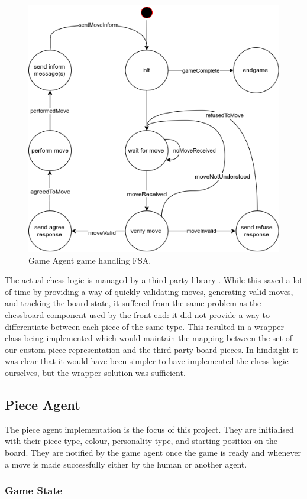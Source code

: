 \documentclass{article}
\begin{document}
\begin{figure}[!ht]
	\centering
	\includegraphics[width=0.8\linewidth]{images/gameagentfsa}
	\caption{Game Agent game handling FSA.}
	\label{fig:gameagentfsa}
\end{figure}

The actual chess logic is managed by a third party library \cite{chesslib}. While this saved a lot of time by providing a way of quickly validating moves, generating valid moves, and tracking the board state, it suffered from the same problem as the chessboard component used by the front-end: it did not provide a way to differentiate between each piece of the same type. This resulted in a wrapper class being implemented which would maintain the mapping between the set of our custom piece representation and the third party board pieces. In hindsight it was clear that it would have been simpler to have implemented the chess logic ourselves, but the wrapper solution was sufficient.

\subsection{Piece Agent}

The piece agent implementation is the focus of this project. They are initialised with their piece type, colour, personality type, and starting position on the board. They are notified by the game agent once the game is ready and whenever a move is made successfully either by the human or another agent. 

\subsubsection{Game State}
\end{document}
